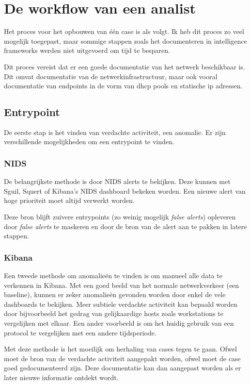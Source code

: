 \documentclass[a4paper,12pt]{report}
\begin{document}
\section{De workflow van een analist}
Het proces voor het opbouwen van één case is als volgt.
Ik heb dit proces zo veel mogelijk toegepast, maar sommige stappen zoals het documenteren in intelligence frameworks werden niet uitgevoerd om tijd te besparen.

Dit proces vereist dat er een goede documentatie van het netwerk beschikbaar is.
Dit omvat documentatie van de netwerkinfrastructuur, maar ook vooral documentatie van endpoints in de vorm van dhcp pools en statische ip adressen.

\subsection{Entrypoint}
De eerste stap is het vinden van verdachte activiteit, een anomalie.
Er zijn verschillende mogelijkheden om een entrypoint te vinden.

\subsubsection{NIDS}
De belangrijkste methode is door NIDS alerts te bekijken.
Deze kunnen met Sguil, Squert of Kibana's NIDS dashboard bekeken worden.
Een nieuwe alert van hoge prioriteit moet altijd verwerkt worden.

Deze bron blijft zuivere entrypoints (zo weinig mogelijk \emph{false alerts}) opleveren door \emph{false alerts} te maskeren en door de bron van de alert aan te pakken in latere stappen.

\subsubsection{Kibana}
Een tweede methode om anomalieën te vinden is om manueel alle data te verkennen in Kibana.
Met een goed beeld van het normale netwerkverkeer (een baseline), kunnen er zeker anomalieën gevonden worden door enkel de vele dashboards te bekijken.
Meer subtiele verdachte activiteit kan bepaald worden door bijvoorbeeld het gedrag van gelijkaardige hosts zoals workstations te vergelijken met elkaar.
Een ander voorbeeld is om het huidig gebruik van een protocol te vergelijken met een andere tijdsperiode.

Met deze methode is het moeilijk om herhaling van cases tegen te gaan.
Ofwel moet de bron van de verdachte activiteit aangepakt worden, ofwel moet de case goed gedocumenteerd zijn.
Deze documentatie kan dan aangepast worden als er later nieuwe informatie ontdekt wordt.
\end{document}
